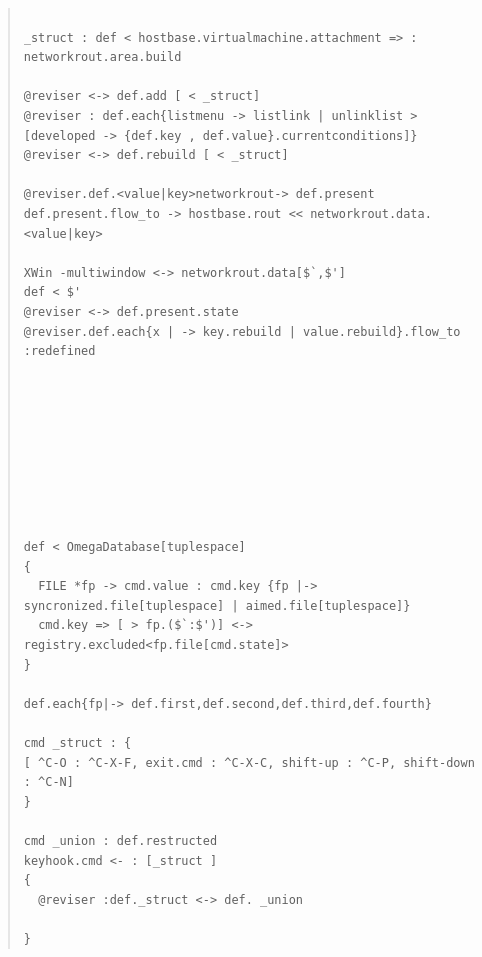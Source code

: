 \documentclass{jsarticle}
\begin{document}
\begin{quote}
\setlength{\baselineskip}{12pt}
\begin{verbatim}

_struct : def < hostbase.virtualmachine.attachment => : networkrout.area.build

@reviser <-> def.add [ < _struct]
@reviser : def.each{listmenu -> listlink | unlinklist > [developed -> {def.key , def.value}.currentconditions]}
@reviser <-> def.rebuild [ < _struct]

@reviser.def.<value|key>networkrout-> def.present
def.present.flow_to -> hostbase.rout << networkrout.data.<value|key>

XWin -multiwindow <-> networkrout.data[$`,$']
def < $'
@reviser <-> def.present.state
@reviser.def.each{x | -> key.rebuild | value.rebuild}.flow_to :redefined









def < OmegaDatabase[tuplespace]
{
  FILE *fp -> cmd.value : cmd.key {fp |-> syncronized.file[tuplespace] | aimed.file[tuplespace]}
  cmd.key => [ > fp.($`:$')] <-> registry.excluded<fp.file[cmd.state]>
}

def.each{fp|-> def.first,def.second,def.third,def.fourth}

cmd _struct : {
[ ^C-O : ^C-X-F, exit.cmd : ^C-X-C, shift-up : ^C-P, shift-down : ^C-N]
}

cmd _union : def.restructed
keyhook.cmd <- : [_struct ]
{
  @reviser :def._struct <-> def. _union

}

\end{verbatim}
\end{quote}
\end{document}
